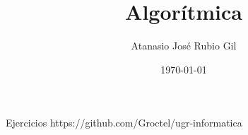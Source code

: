 \documentclass[10pt]{report}
\author{Atanasio José Rubio Gil}
\title{Algorítmica}
\date{\today}
\begin{document}
            {Ejercicios}
            {https://github.com/Groctel/ugr-informatica}
\tableofcontents


\end{document}
